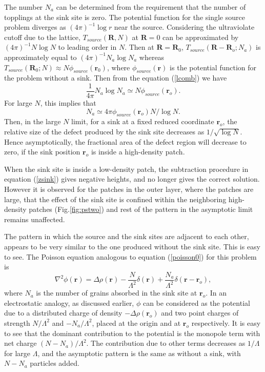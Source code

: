 \documentclass[11pt,a4paper]{book}
\begin{document}
The number $N_{a}$  can be determined from the requirement that the number of topplings at the sink site is zero.  
The potential function for the single source problem diverges as $\left( 4\pi \right)^{-1}\log r$
near the source. Considering the ultraviolate cutoff due to the lattice,
$T_{source}\left( \mathbf{R}, N \right)$ at $\mathbf{R}=0$ can be approximated by
$\left( 4\pi \right)^{-1}N \log N$ to leading order in $N$.
Then at $\mathbf{R} = \mathbf{R}_0$, $T_{source}\left( \mathbf{R}-\mathbf{R}_{o}; N_{a} \right)$ is approximately equal to
$(4\pi)^{-1}N_{a}\log N_{a}$ whereas $T_{source}\left( \mathbf{R}_0; N \right) \approx N \phi_{source}( \mathbf{r}_0) $,
where $\phi_{source}\left( \mathbf{r} \right)$ is the potential function for the problem without a sink. Then 
from the equation (\ref{lcomb}) we have
\begin{equation}
\frac{1}{4\pi}N_a \log N_a \simeq N \phi_{source}\left( \mathbf{r}_{o} \right). 
\end{equation}
For large $N$, this implies that  
\begin{equation}
N_a \simeq 4\pi\phi_{source}\left( \mathbf{r}_{o} \right)N/\log N.
\label{nss1}
\end{equation}
Then, in the large $N$ limit, for a sink at a fixed reduced coordinate $\mathbf{r}_o$,
the relative size of the defect produced by the sink site decreases as
$1/\sqrt{\log N}$. Hence asymptotically, the fractional area of the defect
region will decrease to zero, if the sink position $\mathbf{r}_o$ is inside a high-density patch.


When the sink site is inside a low-density patch, the subtraction procedure in
equation (\ref{zsink}) gives negative heights, and no longer gives the correct solution.  
However it is observed for the patches in the outer layer,
where the patches are large, that the effect of the sink site is confined within the neighboring 
high-density patches (Fig.\ref{fig:pstwo}) and rest of the pattern in the asymptotic 
limit remains unaffected.

The pattern in which the source and the sink sites are adjacent to each other, appears to be
very similar to the one produced without the sink site. This is easy to see. 
The Poisson equation analogous to equation (\ref{poisson0}) for this problem is
\begin{equation}
\nabla^2\phi(\mathbf{r})=\Delta\rho(\mathbf{r})-\frac{N}{\Lambda^2}\delta(\mathbf{r})+\frac{N_{a}}{\Lambda^2}\delta(\mathbf{r}-\mathbf{r}_o),
\label{poisson3}
\end{equation}
where $N_a$ is the number of grains absorbed in the sink site at $\mathbf{r}_{o}$. 
In an electrostatic analogy, as discussed earlier, $\phi$ can be considered
as the potential due to a distributed charge of density $-\Delta\rho\left( \mathbf{r}_{o} \right)$
and two point charges of strength $N/\Lambda^{2}$ and $-N_{a}/\Lambda^{2}$, placed
at the origin and at $\mathbf{r}_{o}$ respectively.
It is easy to see  that the dominant contribution to the potential is the  monopole term with net
charge $(N- N_a)/\Lambda^2$. The contribution due to other terms decreases as
$1/\Lambda$ for large $\Lambda$, and the asymptotic pattern is the same as without a sink, with $N-N_a$ particles added.
\end{document}
